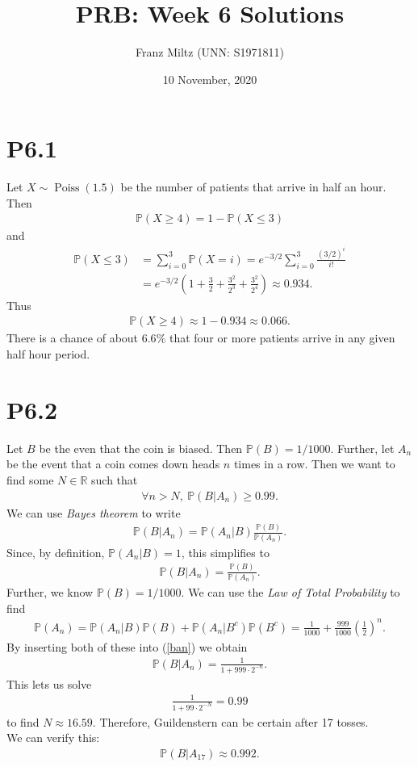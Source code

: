 \documentclass{article}
\newcommand{\R}{\mathbb{R}}
\renewcommand{\P}{\mathbb{P}}
\DeclareMathOperator{\Poiss}{Poiss}
\begin{document}
\title{PRB: Week 6 Solutions}
\author{Franz Miltz (UNN: S1971811)}
\date{10 November, 2020}
\maketitle
\section*{P6.1}
Let $X\sim\Poiss(1.5)$ be the number of patients that arrive in half an hour. Then
\begin{align*}
  \P(X \geq 4) = 1 - \P(X \leq 3)
\end{align*}
and
\begin{align*}
  \P(X \leq 3) &= \sum_{i=0}^3 \P(X=i)=e^{-3/2}\sum_{i=0}^3 \frac{(3/2)^i}{i!}\\
  &=e^{-3/2} (1+\frac{3}{2}+\frac{3^2}{2^3}+\frac{3^2}{2^4})
  \approx 0.934.
\end{align*}
Thus
\begin{align*}
  \P(X\geq 4) \approx 1 - 0.934 \approx 0.066.
\end{align*}
There is a chance of about $6.6\%$ that four or more patients arrive in
any given half hour period.
\section*{P6.2}
Let $B$ be the even that the coin is biased. Then $\P(B)=1/1000$. Further,
let $A_n$ be the event that a coin comes down heads $n$ times in a row.
Then we want to find some $N\in\R$ such that
\begin{align*}
  \forall n > N,\: \P(B|A_n)\geq 0.99.
\end{align*}
We can use \emph{Bayes theorem} to write
\begin{align*}
  \P(B|A_n) = \P(A_n|B)\frac{\P(B)}{\P(A_n)}.
\end{align*}
Since, by definition, $\P(A_n|B)=1$, this simplifies to
\begin{align}
  \label{ban}
  \P(B|A_n) = \frac{\P(B)}{\P(A_n)}.
\end{align}
Further, we know $\P(B)=1/1000$. We can use the \emph{Law of Total
Probability} to find
\begin{align*}
  \P(A_n)=\P(A_n|B)\P(B) + \P(A_n|B^c)\P(B^c)
  =\frac{1}{1000}+\frac{999}{1000}\left(\frac{1}{2}\right)^n.
\end{align*}
By inserting both of these into (\ref{ban}) we obtain
\begin{align*}
  \P(B|A_n) = \frac{1}{1+999\cdot 2^{-n}}.
\end{align*}
This lets us solve
\begin{align*}
  \frac{1}{1+99\cdot 2^{-N}} = 0.99
\end{align*}
to find $N\approx 16.59$. Therefore, Guildenstern can be certain after
17 tosses.\\
We can verify this:
\begin{align*}
  \P(B|A_{17}) \approx 0.992.
\end{align*}
\end{document}
